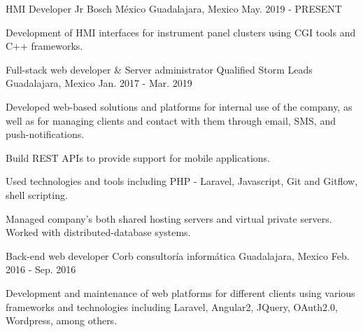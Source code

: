 \begin{cventries}
    \cventry
        {HMI Developer Jr}
        {Bosch México}
        {Guadalajara, Mexico}
        {May. 2019 - PRESENT}
        {
            \begin{cvitems}
                \item {Development of HMI interfaces for instrument panel clusters using CGI tools and C++ frameworks.}
            \end{cvitems}
        }
    \cventry
        {Full-stack web developer \& Server administrator}
        {Qualified Storm Leads}
        {Guadalajara, Mexico}
        {Jan. 2017 - Mar. 2019}
        {
            \begin{cvitems}
                \item {Developed web-based solutions and platforms for internal use of the company, as well as for managing clients and contact with them through email, SMS, and push-notifications.}
                \item {Build REST APIs to provide support for mobile applications.}
                \item {Used technologies and tools including PHP - Laravel, Javascript, Git and Gitflow, shell scripting.}
                \item {Managed company's both shared hosting servers and virtual private servers. Worked with distributed-database systems.}
            \end{cvitems}
        }
    \cventry
        {Back-end web developer}
        {Corb consultoría informática}
        {Guadalajara, Mexico}
        {Feb. 2016 - Sep. 2016}
        {
            \begin{cvitems}
                \item {Development and maintenance of web platforms for different clients using various frameworks and technologies including Laravel, Angular2, JQuery, OAuth2.0, Wordpress, among others.}
            \end{cvitems}
        }
\end{cventries}
